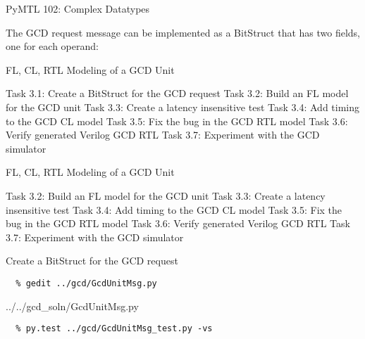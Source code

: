 \begin{frame}{PyMTL 102: Complex Datatypes}

The GCD request message can be implemented as a BitStruct that has two
fields, one for each operand:

\vspace{.2in}
\end{frame}


\begin{frame}{ FL, CL, RTL Modeling of a GCD Unit}
\begin{cbxlist}
  \1 Task 3.1: Create a BitStruct for the GCD request
  \1 Task 3.2: Build an FL model for the GCD unit
  \1 Task 3.3: Create a latency insensitive test
  \1 Task 3.4: Add timing to the GCD CL model
  \1 Task 3.5: Fix the bug in the GCD RTL model
  \1 Task 3.6: Verify generated Verilog GCD RTL
  \1 Task 3.7: Experiment with the GCD simulator
\end{cbxlist}
\end{frame}

\begin{frame}{ FL, CL, RTL Modeling of a GCD Unit}
\begin{cbxlist}
  \1 
  \1 Task 3.2: Build an FL model for the GCD unit
  \1 Task 3.3: Create a latency insensitive test
  \1 Task 3.4: Add timing to the GCD CL model
  \1 Task 3.5: Fix the bug in the GCD RTL model
  \1 Task 3.6: Verify generated Verilog GCD RTL
  \1 Task 3.7: Experiment with the GCD simulator
\end{cbxlist}
\end{frame}

\begin{task}\begin{frame}[fragile]{Create a BitStruct for the GCD request}
\vspace{-0.2in}
\begin{Verbatim}[commandchars=\\\{\}]
  % cd    \midtilde/pymtl-tut/build
  % gedit ../gcd/GcdUnitMsg.py
\end{Verbatim}

\vspace{-.1in}
%
{../../gcd_soln/GcdUnitMsg.py}

\vspace{-.2in}
\begin{verbatim}
  % py.test ../gcd/GcdUnitMsg_test.py -vs
\end{verbatim}
\end{frame}
\end{task}

